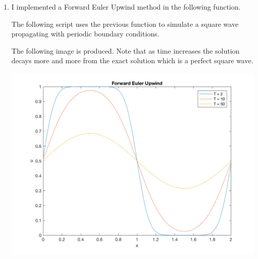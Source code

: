 \documentclass[11pt, oneside]{article}
\begin{document}
\begin{enumerate}


  \item %
    I implemented a Forward Euler Upwind method in the following \MATLAB{} function.
    
    The following script uses the previous function to simulate a square wave
    propagating with periodic boundary conditions.
    
    The following image is produced.
    Note that as time increases the solution decays more and more from the exact solution
    which is a perfect square wave.
    \begin{center}
      \includegraphics[scale=.8]{Figures/01_02.png}
    \end{center}


\end{enumerate}
\end{document}
